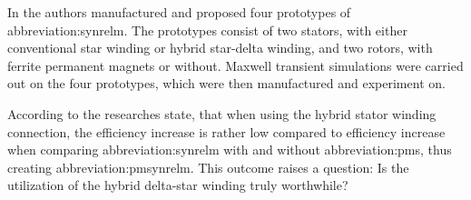 \documentclass[a4paper, twoside, 11pt]{article}
\begin{document}
        In \cite{ibrahim-permanent-magnet-assisted-synchronous-reluctance-motor-employing-a-hybrid-star-delta-winding-for-high-speed-applicaitons} the authors manufactured and proposed four prototypes of \gls{abbreviation:synrelm}. The prototypes consist of two stators, with either conventional star winding or hybrid star-delta winding, and two rotors, with ferrite permanent magnets or without. Maxwell transient simulations were carried out on the four prototypes, which were then manufactured and experiment on.\par
    According to \cite{ibrahim-permanent-magnet-assisted-synchronous-reluctance-motor-employing-a-hybrid-star-delta-winding-for-high-speed-applicaitons} the researches state, that when using the hybrid stator winding connection, the efficiency increase is rather low compared to efficiency increase when comparing \gls{abbreviation:synrelm} with and without \gls{abbreviation:pm}s, thus creating \gls{abbreviation:pmsynrelm}. This outcome raises a question: Is the utilization of the hybrid delta-star winding truly worthwhile?\par
\end{document}
